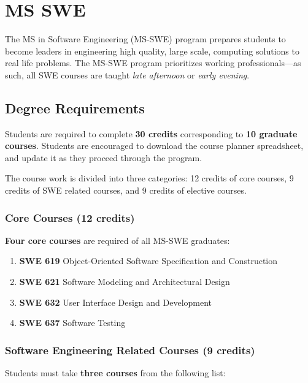 \documentclass[oneside,11pt]{memoir}
\begin{document}
\chapter{MS SWE}

The MS in Software Engineering (MS-SWE) program prepares students to become leaders in engineering high quality, large scale, computing solutions to real life problems. The MS-SWE program prioritizes working professionals—as such, all SWE courses are taught \emph{late afternoon} or \emph{early evening}.

\section{Degree Requirements}

Students are required to complete \textbf{30 credits} corresponding to \textbf{10 graduate courses}. Students are encouraged to download the course planner spreadsheet, and update it as they proceed through the program.

The course work is divided into three categories: 12 credits of core courses, 9 credits of SWE related courses, and 9 credits of elective courses.

\subsection{Core Courses (12 credits)}

\textbf{Four core courses} are required of all MS-SWE graduates:

\begin{enumerate}
    \item \textbf{SWE 619} Object-Oriented Software Specification and Construction
    \item \textbf{SWE 621} Software Modeling and Architectural Design
    \item \textbf{SWE 632} User Interface Design and Development
    \item \textbf{SWE 637} Software Testing
\end{enumerate}

\subsection{Software Engineering Related Courses (9 credits)}

Students must take \textbf{three courses} from the following list:
\end{document}
